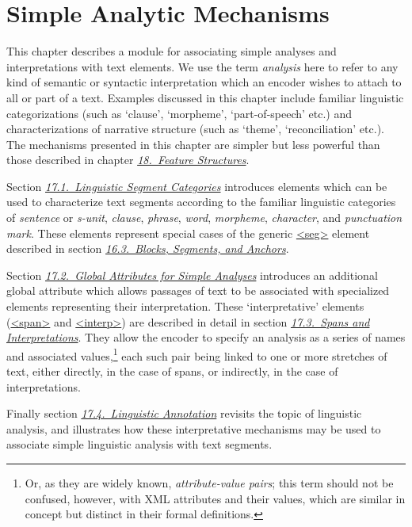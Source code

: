 
\section[{Simple Analytic Mechanisms}]{Simple Analytic Mechanisms}\label{AI}\par
This chapter describes a module for associating simple analyses and interpretations with text elements. We use the term \textit{analysis} here to refer to any kind of semantic or syntactic interpretation which an encoder wishes to attach to all or part of a text. Examples discussed in this chapter include familiar linguistic categorizations (such as ‘clause’, ‘morpheme’, ‘part-of-speech’ etc.) and characterizations of narrative structure (such as ‘theme’, ‘reconciliation’ etc.). The mechanisms presented in this chapter are simpler but less powerful than those described in chapter \textit{\hyperref[FS]{18.\ Feature Structures}}.\par
Section \textit{\hyperref[AILC]{17.1.\ Linguistic Segment Categories}} introduces elements which can be used to characterize text segments according to the familiar linguistic categories of \textit{sentence} or \textit{s-unit}, \textit{clause}, \textit{phrase}, \textit{word}, \textit{morpheme}, \textit{character}, and \textit{punctuation mark}. These elements represent special cases of the generic \hyperref[TEI.seg]{<seg>} element described in section \textit{\hyperref[SASE]{16.3.\ Blocks, Segments, and Anchors}}.\par
Section \textit{\hyperref[AIATTS]{17.2.\ Global Attributes for Simple Analyses}} introduces an additional global attribute which allows passages of text to be associated with specialized elements representing their interpretation. These ‘interpretative’ elements (\hyperref[TEI.span]{<span>} and \hyperref[TEI.interp]{<interp>}) are described in detail in section \textit{\hyperref[AISP]{17.3.\ Spans and Interpretations}}. They allow the encoder to specify an analysis as a series of names and associated values,\footnote{Or, as they are widely known, \textit{attribute-value pairs}; this term should not be confused, however, with XML attributes and their values, which are similar in concept but distinct in their formal definitions.} each such pair being linked to one or more stretches of text, either directly, in the case of spans, or indirectly, in the case of interpretations.\par
Finally section \textit{\hyperref[AILA]{17.4.\ Linguistic Annotation}} revisits the topic of linguistic analysis, and illustrates how these interpretative mechanisms may be used to associate simple linguistic analysis with text segments.

